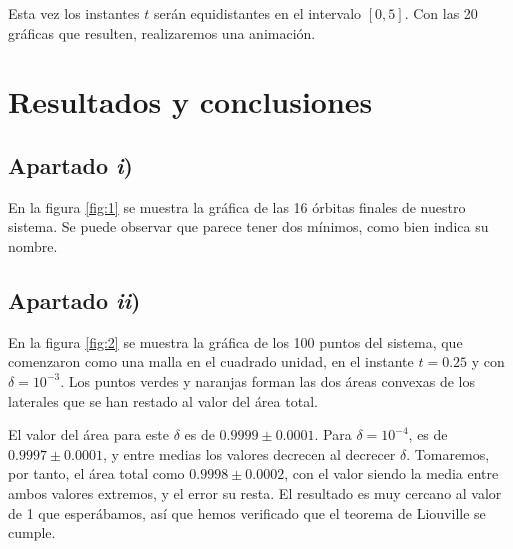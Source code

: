\documentclass[a4paper]{article}
\begin{document}
	Esta vez los instantes $t$ serán equidistantes en el intervalo $[0,5]$. Con las 20 gráficas que resulten, realizaremos una animación.
	
	\section{Resultados y conclusiones}
	
	\subsection{Apartado \textit{i})}
	En la figura \ref{fig:1} se muestra la gráfica de las 16 órbitas finales de nuestro sistema. Se puede observar que parece tener dos mínimos, como bien indica su nombre.
	
	
	\subsection{Apartado \textit{ii})}
	En la figura \ref{fig:2} se muestra la gráfica de los 100 puntos del sistema, que comenzaron como una malla en el cuadrado unidad, en el instante $t=0.25$ y con $\delta=10^{-3}$. Los puntos verdes y naranjas forman las dos áreas convexas de los laterales que se han restado al valor del área total. 
	
	El valor del área para este $\delta$ es de $0.9999 \pm 0.0001$. Para $\delta=10^{-4}$, es de $0.9997 \pm 0.0001$, y entre medias los valores decrecen al decrecer $\delta$. Tomaremos, por tanto, el área total como $0.9998 \pm 0.0002$, con el valor siendo la media entre ambos valores extremos, y el error su resta. El resultado es muy cercano al valor de 1 que esperábamos, así que hemos verificado que el teorema de Liouville se cumple.
	
\end{document}
